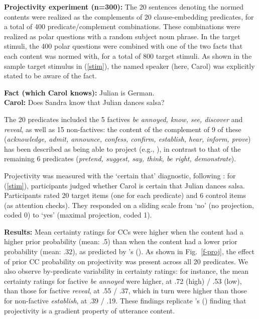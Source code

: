 \documentclass[12pt,fleqn]{article}
\newcommand{\citetpos}[1]{\citeauthor{#1}'s (\citeyear{#1})}
\newcommand{\6}{\mbox{$[\hspace*{-.6mm}[$}}
\newcommand{\9}{\mbox{$]\hspace*{-.6mm}]$}}
\begin{document}
\noindent 
{\bf Projectivity experiment (n=300):} The 20 sentences denoting the normed contents were realized as the complements of 20 clause-embedding predicates, for a total of 400 predicate/complement combinations. These combinations were realized as polar questions with a random subject noun phrase. In the target stimuli, the 400 polar questions were combined with one of the two facts that each content was normed with, for a total of 800 target stimuli. As shown in the sample target stimulus in (\ref{stim}), the named speaker (here, Carol) was explicitly stated to be aware of the fact.
\vspace*{-.15cm}
\begin{exe}
\ex\label{stim}
{\bf Fact (which Carol knows):} Julian is German.  \\ 
{\bf Carol:} Does Sandra know that Julian dances salsa?
\end{exe}
\vspace*{-.15cm}
The 20 predicates included the 5 factives {\em be annoyed, know, see, discover} and {\em reveal}, as well as 15 non-factives: the content of the complement of 9 of these ({\em acknowledge, admit, announce, confess, confirm, establish, hear, inform, prove}) has been described as being able to project (e.g., \citealt{schlenker10,anand-hacquard2014,spector-egre2015,tbd-variability}), in contrast to that of the remaining 6 predicates ({\em pretend, suggest, say, think, be right, demonstrate}).

\noindent Projectivity was measured with the `certain that' diagnostic, following \citealt{tbd-variability}: for (\ref{stim}), participants judged whether Carol is certain that Julian dances salsa. Participants rated 20 target items (one for each predicate) and 6 control items (as attention checks). They responded on a sliding scale from `no' (no projection, coded 0) to `yes' (maximal projection, coded 1).

\noindent
{\bf Results:} Mean certainty ratings for CCs were higher when the content had a higher prior probability (mean: .5) than when the content had a lower prior probability (mean: .32), as predicted by \citetpos{tbd-variability}. As shown in Fig.~\ref{f-proj}, the effect of prior CC probability on projectivity was present across all 20 predicates. We also observe by-predicate variability in certainty ratings:  for instance, the mean certainty ratings for factive {\em be annoyed} were higher, at .72 (high) / .53 (low), than those for factive {\em reveal}, at .55 / .37, which in turn were higher than those for non-factive {\em establish}, at .39 / .19. These findings replicate \citetpos{tbd-variability} finding that projectivity is a gradient property of utterance content.
\end{document}

